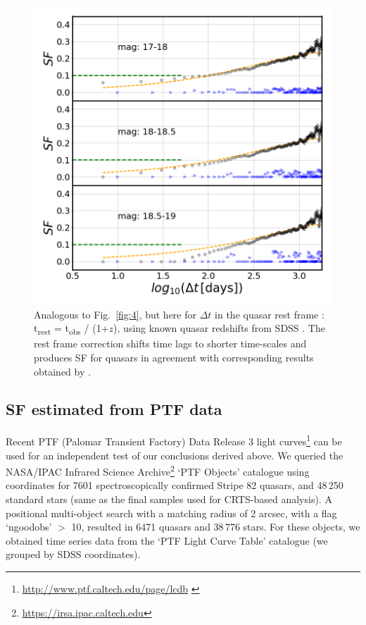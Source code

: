 \documentclass[fleqn,usenatbib]{mnras}
\begin{document}
\begin{figure}

\vskip -0.15in
\includegraphics[width=1.1\columnwidth, center]{Fig_5.png}
\caption{Analogous to Fig.~\ref{fig:4}, but here for $\Delta t$ in the quasar rest frame : t\textsubscript{rest} = t\textsubscript{obs} / (1+$z$), using known quasar redshifts from SDSS \citep{macleod2010}.  The rest frame correction shifts time lags to shorter time-scales and produces SF for quasars in agreement with corresponding results obtained by \citealt{macleod2010}.}
\label{fig:5}
\end{figure}


\subsection{SF estimated from PTF data}

Recent PTF (Palomar Transient Factory) Data Release 3 light curves\footnote{\url{http://www.ptf.caltech.edu/page/lcdb} \citep{rau2009}}
can be used for an independent test of our conclusions derived above. We queried the NASA/IPAC Infrared Science 
Archive\footnote{\url{https://irsa.ipac.caltech.edu}} `PTF Objects' catalogue using coordinates for 7601 spectroscopically
confirmed Stripe 82 quasars, and 48$\,$250 standard stars (same as the final samples used for CRTS-based analysis).
A positional multi-object search with a matching radius of 2 arcsec, with a flag `ngoodobs' $>$ 10,  resulted in  
6471 quasars and 38$\,$776 stars.  For these objects, we obtained time series data from the `PTF Light Curve Table' catalogue
(we grouped by SDSS coordinates). 
\end{document}
